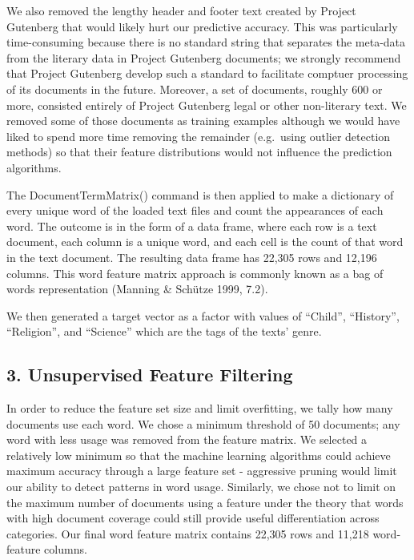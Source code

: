 \documentclass[12pt,]{article}
\begin{document}
We also removed the lengthy header and footer text created by Project
Gutenberg that would likely hurt our predictive accuracy. This was
particularly time-consuming because there is no standard string that
separates the meta-data from the literary data in Project Gutenberg
documents; we strongly recommend that Project Gutenberg develop such a
standard to facilitate comptuer processing of its documents in the
future. Moreover, a set of documents, roughly 600 or more, consisted
entirely of Project Gutenberg legal or other non-literary text. We
removed some of those documents as training examples although we would
have liked to spend more time removing the remainder (e.g.~using outlier
detection methods) so that their feature distributions would not
influence the prediction algorithms.

The DocumentTermMatrix() command is then applied to make a dictionary of
every unique word of the loaded text files and count the appearances of
each word. The outcome is in the form of a data frame, where each row is
a text document, each column is a unique word, and each cell is the
count of that word in the text document. The resulting data frame has
22,305 rows and 12,196 columns. This word feature matrix approach is
commonly known as a bag of words representation (Manning \& Schütze
1999, 7.2).

We then generated a target vector as a factor with values of ``Child'',
``History'', ``Religion'', and ``Science'' which are the tags of the
texts' genre.

\subsection{3. Unsupervised Feature
Filtering}\label{unsupervised-feature-filtering}

In order to reduce the feature set size and limit overfitting, we tally
how many documents use each word. We chose a minimum threshold of 50
documents; any word with less usage was removed from the feature matrix.
We selected a relatively low minimum so that the machine learning
algorithms could achieve maximum accuracy through a large feature set -
aggressive pruning would limit our ability to detect patterns in word
usage. Similarly, we chose not to limit on the maximum number of
documents using a feature under the theory that words with high document
coverage could still provide useful differentiation across categories.
Our final word feature matrix contains 22,305 rows and 11,218
word-feature columns.
\end{document}
